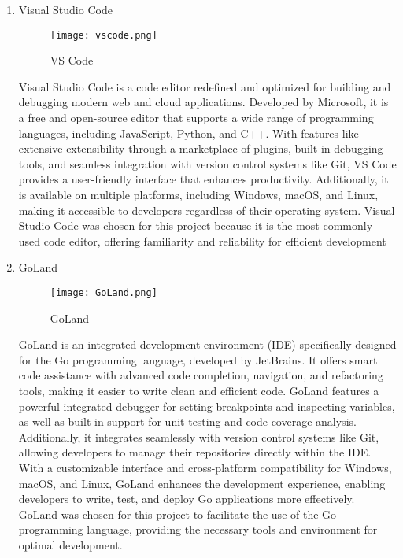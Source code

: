 \documentclass[conference]{IEEEtran}
\begin{document}
\begin{enumerate}[itemsep=2ex, parsep=1ex]
	\item Visual Studio Code
	      	      
	      \begin{figure}[h!]
	      	\centering
	      	\texttt{[image: vscode.png]}
	      	\caption{VS Code}
	      	\label{fig:VSCode}
	      \end{figure}
	      	      
	      Visual Studio Code is a code editor redefined and optimized for building
	      and debugging modern web and cloud applications. Developed by Microsoft,
	      it is a free and open-source editor that supports a wide range of
	      programming languages, including JavaScript, Python, and C++. With
	      features like extensive extensibility through a marketplace of plugins, built-in
	      debugging tools, and seamless integration with version control systems
	      like Git, VS Code provides a user-friendly interface that enhances productivity.
	      Additionally, it is available on multiple platforms, including Windows, macOS,
	      and Linux, making it accessible to developers regardless of their operating
	      system. Visual Studio Code was chosen for this project because it is the
	      most commonly used code editor, offering familiarity and reliability for efficient
	      development
	      
	      \vspace{5cm}
	      	      
	\item GoLand
	      	      
	      \begin{figure}[h!]
	      	\centering
	      	\texttt{[image: GoLand.png]}
	      	\caption{GoLand}
	      	\label{fig:GoLand}
	      \end{figure}
	      	      
	      GoLand is an integrated development environment (IDE) specifically
	      designed for the Go programming language, developed by JetBrains. It
	      offers smart code assistance with advanced code completion, navigation,
	      and refactoring tools, making it easier to write clean and efficient code.
	      GoLand features a powerful integrated debugger for setting breakpoints and
	      inspecting variables, as well as built-in support for unit testing and code
	      coverage analysis. Additionally, it integrates seamlessly with version control
	      systems like Git, allowing developers to manage their repositories
	      directly within the IDE. With a customizable interface and cross-platform compatibility
	      for Windows, macOS, and Linux, GoLand enhances the development experience,
	      enabling developers to write, test, and deploy Go applications more effectively.
	      GoLand was chosen for this project to facilitate the use of the Go
	      programming language, providing the necessary tools and environment for optimal
	      development.
	      	      

\end{enumerate}
\end{document}
